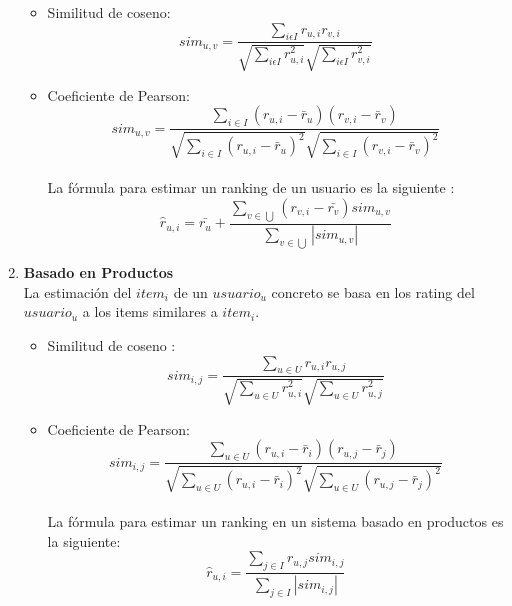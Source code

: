 \begin{enumerate}
\begin{itemize}
\item Similitud de coseno:\\\begin{equation}sim_{u,v}=\frac{\sum_{i\epsilon I}r_{u,i}r_{v,i}}{\sqrt{\sum_{i\epsilon I}r_{u,i}^{2}}\sqrt{\sum_{i\epsilon I}r_{v,i}^{2}}}
\end{equation}
\item Coeficiente de Pearson:\\ \begin{equation}sim_{u,v}=\frac{\sum_{i \in I}(r_{u,i}-\bar{r}_{u}) (r_{v,i}-\bar{r}_{v})}{\sqrt{\sum_{i \in I}(r_{u,i}-\bar{r}_{u})^{2}} \sqrt{\sum_{i \in I}(r_{v,i} - \bar{r}_{v})^{2}}}
\end{equation}
 \\La fórmula para estimar un ranking de un usuario es la siguiente : \begin{equation}
\hat{r}_{u,i}= \bar{r_{u}}+\frac{\sum_{v\in \bigcup }(r_{v,i}-\bar{r_{v}})sim_{u,v}}{\sum_{v\in \bigcup } \left | sim_{u,v} \right |} 
\end{equation}
\end{itemize}
\item \textbf{Basado en Productos}\\La estimación del  $item_{i}$ de un $usuario_{u}$ concreto se basa en los rating del $usuario_{u}$ a los items similares a $item_{i}$.\\ \begin{itemize}
\item Similitud de coseno : \\ \begin{equation}
sim_{i,j }=\frac{\sum_{u\in U}r_{u,i}r_{u,j}}{\sqrt{\sum_{u\in U}r^{2}_{u,i}}\sqrt{\sum_{u\in U}r^{2}_{u,j}}}
\end{equation}
\item Coeficiente de Pearson: \\ \begin{equation}
sim_{i,j}=\frac{\sum_{u \in U}(r_{u,i}-\bar{r}_{i}) (r_{u,j}-\bar{r}_{j})}{\sqrt{\sum_{u \in U}(r_{u,i}-\bar{r}_{i})^{2}} \sqrt{\sum_{u \in U}(r_{u,j} - \bar{r}_{j})^{2}}}
\end{equation} \\La fórmula para estimar un ranking en un sistema basado en productos es la siguiente:\nocite{ubu:recomendacion} \\ \begin{equation}
\hat{r}_{u,i}= \frac{\sum_{j\in I }r_{u,j}sim_{i,j}}{\sum_{j\in I } \left | sim_{i,j} \right |} 
\end{equation}
\end{itemize}
\end{enumerate}


